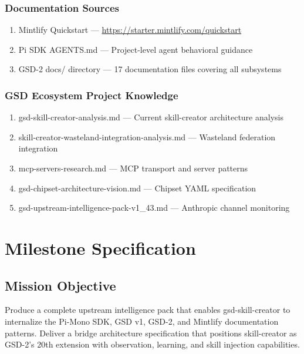 \documentclass[11pt,letterpaper]{article}
\newcommand{\stageheader}[2]{%
  \noindent\colorbox{#2}{\makebox[\textwidth][l]{%
    \textcolor{white}{\bfseries\sffamily\hspace{6pt}#1\hspace{6pt}}}}%
  \vspace{0.5em}\par%
}
\begin{document}
\subsubsection{Documentation Sources}

\begin{enumerate}[leftmargin=2em]
\item Mintlify Quickstart --- \url{https://starter.mintlify.com/quickstart}
\item Pi SDK AGENTS.md --- Project-level agent behavioral guidance
\item GSD-2 docs/ directory --- 17 documentation files covering all subsystems
\end{enumerate}

\subsubsection{GSD Ecosystem Project Knowledge}

\begin{enumerate}[leftmargin=2em]
\item gsd-skill-creator-analysis.md --- Current skill-creator architecture analysis
\item skill-creator-wasteland-integration-analysis.md --- Wasteland federation integration
\item mcp-servers-research.md --- MCP transport and server patterns
\item gsd-chipset-architecture-vision.md --- Chipset YAML specification
\item gsd-upstream-intelligence-pack-v1\_43.md --- Anthropic channel monitoring
\end{enumerate}

\newpage

\stageheader{STAGE 3 --- MISSION PACKAGE}{tertiary}

\section{Milestone Specification}

\subsection{Mission Objective}

Produce a complete upstream intelligence pack that enables gsd-skill-creator to internalize the Pi-Mono SDK, GSD v1, GSD-2, and Mintlify documentation patterns. Deliver a bridge architecture specification that positions skill-creator as GSD-2's 20th extension with observation, learning, and skill injection capabilities.
\end{document}
